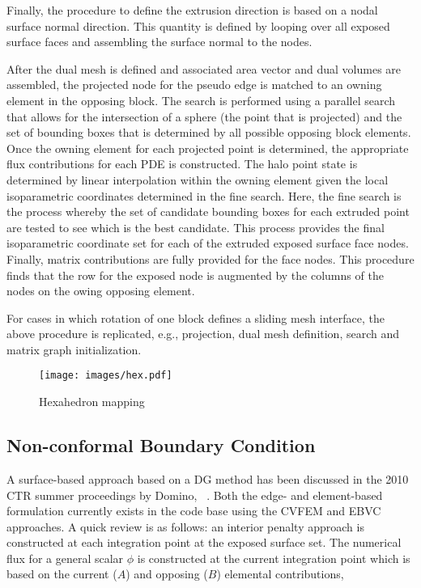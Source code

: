 Finally, the procedure to define the extrusion direction is based on a nodal surface normal direction.
This quantity is defined by looping over all exposed surface faces and assembling the surface normal to the nodes.

After the dual mesh is defined and associated area vector and dual volumes are assembled, the projected
node for the pseudo edge is matched to an owning element in the opposing block. The search is performed using a
parallel search that allows for the intersection of a sphere (the point that is projected) and the set of bounding boxes
that is determined by all possible opposing block elements. Once the owning element for each projected point
is determined, the appropriate flux contributions for each PDE is constructed. The halo point state is determined by linear
interpolation within the owning element given the local isoparametric coordinates determined in the fine search. Here, the 
fine search is the process whereby the set of candidate bounding boxes for each extruded point are tested to see which
is the best candidate. This process provides the final isoparametric coordinate set for each of the extruded exposed surface
face nodes. Finally, matrix contributions are fully provided for the face nodes. This procedure finds that the row for the
exposed node is augmented by the columns of the nodes on the owing opposing element.

For cases in which rotation of one block defines a sliding mesh interface, the above procedure is replicated, e.g., projection,
dual mesh definition, search and matrix graph initialization.
\begin{figure}[ht]
\centerline{\texttt{[image: images/hex.pdf]}}
\vspace{0.1in}
\caption{Hexahedron mapping}
\label{quad-halo}
\end{figure}

\subsection{Non-conformal Boundary Condition}
A surface-based approach based on a DG method has been discussed in the 2010 CTR summer proceedings by Domino, ~\cite{Domino:2010}. 
Both the edge- and element-based formulation currently exists in the code base using the CVFEM and EBVC approaches. A quick review is as follows: an interior penalty approach is constructed at each integration point at the exposed surface set. The numerical flux for a general scalar $\phi$ is constructed at the current integration point which is based on the current ($A$) and opposing ($B$) elemental contributions,

